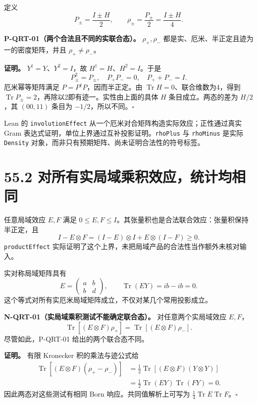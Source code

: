 \documentclass[
  11pt,
  oneside]{book}
\begin{document}
定义 \[
P_\pm=\frac{I\pm H}{2},\qquad
\rho_\pm=\frac{P_\pm}{2}=\frac{I\pm H}{4}.
\]

\protect\hypertarget{p-qrt-01}{}{}

\textbf{P-QRT-01（两个合法且不同的实联合态）。} \(\rho_+,\rho_-\)
都是实、厄米、半正定且迹为一的密度矩阵，并且 \(\rho_+\ne\rho_-\)。

\textbf{证明。} \(Y^\dagger=Y\)、\(Y^2=I\)，故
\(H^\dagger=H\)、\(H^2=I\)。于是 \[
P_\pm^2=P_\pm,\quad P_+P_-=0,\quad P_++P_-=I.
\] 厄米幂等矩阵满足 \(P=P^\dagger P\)，因而半正定。由
\(\operatorname{Tr}H=0\)、联合维数为4，得到
\(\operatorname{Tr}P_\pm=2\)，再除以2即有迹一。实性由上面的具体 \(H\)
条目成立。两态的差为 \(H/2\)，其 \((00,11)\) 条目为
\(-1/2\)，所以不同。\(\square\)

Lean 的 \texttt{involution\allowbreak Effect}
从一个厄米对合矩阵构造实际效应；正性通过真实 Gram
表达式证明，单位上界通过互补投影证明。\texttt{rho\allowbreak Plus} 与
\texttt{rho\allowbreak Minus} 是实际 \texttt{Density}
对象，而非只有预期矩阵、尚未证明合法性的符号标签。

\section{55.2 对所有实局域乘积效应，统计均相同}

任意局域效应 \(E,F\) 满足
\(0\le E,F\le I\)。其张量积也是合法联合效应：张量积保持半正定，且 \[
I-E\otimes F=(I-E)\otimes I+E\otimes(I-F)\ge0.
\] \texttt{product\allowbreak Effect}
实际证明了这个上界，未把局域产品的合法性当作额外未核对输入。

实对称局域矩阵具有 \[
E=\begin{pmatrix}a&b\\b&d\end{pmatrix},
\qquad \operatorname{Tr}(EY)=ib-ib=0.
\] 这个等式对所有实厄米局域矩阵成立，不仅对某几个常用投影成立。

\protect\hypertarget{n-qrt-01}{}{}

\textbf{N-QRT-01（实局域乘积测试不能确定联合态）。} 对任意两个实局域效应
\(E,F\)， \[
\operatorname{Tr}[(E\otimes F)\rho_+]
=\operatorname{Tr}[(E\otimes F)\rho_-].
\] 尽管如此，P-QRT-01 给出的两个联合态不同。

\textbf{证明。} 有限 Kronecker 积的乘法与迹公式给 \[
\begin{aligned}
\operatorname{Tr}[(E\otimes F)(\rho_+-\rho_-)]
&=\tfrac12\operatorname{Tr}[(E\otimes F)(Y\otimes Y)]\\
&=\tfrac12\operatorname{Tr}(EY)\operatorname{Tr}(FY)=0.
\end{aligned}
\] 因此两态对这些测试有相同 Born 响应。共同值解析上可写为
\(\tfrac14\operatorname{Tr}E\operatorname{Tr}F\)。\(\square\)
\end{document}
